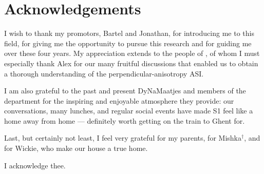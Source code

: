 \newpage
\thispagestyle{empty}
\null
\newpage

\clearpage
\thispagestyle{empty}


\chapter*{Acknowledgements}\label{sec:Acknowledgements}
I wish to thank my promotors, Bartel and Jonathan, for introducing me to this field, for giving me the opportunity to pursue this research and for guiding me over these four years.
My appreciation extends to the people of \spinengine, of whom I must especially thank Alex for our many fruitful discussions that enabled us to obtain a thorough understanding of the perpendicular-anisotropy ASI. \\\par


I am also grateful to the past and present DyNaMaatjes and members of the department for the inspiring and enjoyable atmosphere they provide: our conversations, many lunches, and regular social events have made S1 feel like a home away from home --- definitely worth getting on the train to Ghent for.
\\\par

Last, but certainly not least, I feel very grateful for my parents, for Mishka$^\dagger$, and for Wickie, who make our house a true home. \\\par

I acknowledge thee.
\clearpage

